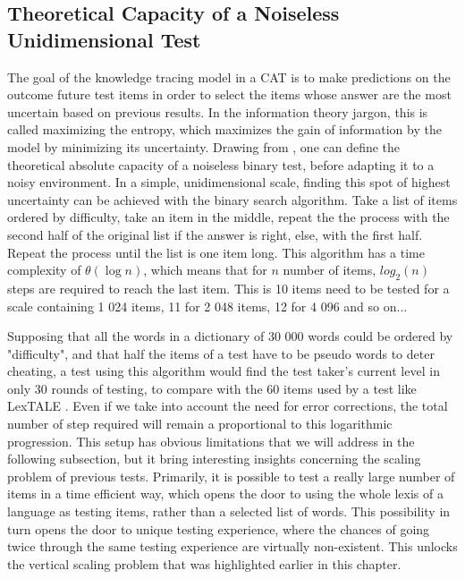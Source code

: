     \subsection{Theoretical Capacity of a Noiseless Unidimensional Test}
The goal of the knowledge tracing model in a CAT is to make predictions on the outcome future test items in order to select the items whose answer are the most uncertain based on previous results. In the information theory jargon, this is called maximizing the entropy, which maximizes the gain of information by the model by minimizing its uncertainty. Drawing from \textcite{shannon_mathematical_1948}, one can define the theoretical absolute capacity of a noiseless binary test, before adapting it to a noisy environment. In a simple, unidimensional scale, finding this spot of highest uncertainty can be achieved with the binary search algorithm. Take a list of items ordered by difficulty, take an item in the middle,  repeat the the process with the second half of the original list if the answer is right, else, with the first half. Repeat the process until the list is one item long. This algorithm has a time complexity of $\theta(\log{n})$, which means that for $n$ number of items, $log_2(n)$ steps are required to reach the last item. This is 10 items need to be tested for a scale containing 1 024 items, 11 for 2 048 items, 12 for 4 096 and so on...

Supposing that all the words in a dictionary of 30 000 words could be ordered by "difficulty", and that half the items of a test have to be pseudo words to deter cheating, a test using this algorithm would find the test taker's current level in only 30 rounds of testing, to compare with the 60 items used by a test like LexTALE \parencite{lemhofer_introducing_2012}. Even if we take into account the need for error corrections, the total number of step required will remain a proportional to this logarithmic progression. This setup has obvious limitations that we will address in the following subsection, but it bring interesting insights concerning the scaling problem of previous tests. Primarily, it is possible to test a really large number of items in a time efficient way, which opens the door to using the whole lexis of a language as testing items, rather than a selected list of words. This possibility in turn opens the door to unique testing experience, where the chances of going twice through the same testing experience are virtually non-existent. This unlocks the vertical scaling problem that was highlighted earlier in this chapter.

